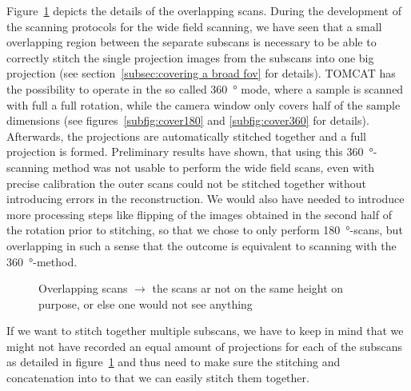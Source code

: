 Figure~\ref{fig:overlapping scans} depicts the details of the overlapping scans. During the development of the scanning protocols for the wide field scanning, we have seen that a small overlapping region between the separate subscans is necessary to be able to correctly stitch the single projection images from the subscans into one big projection (see section~\ref{subsec:covering a broad fov} for details). TOMCAT has the possibility to operate in the so called \SI{360}{\degree} mode, where a sample is scanned with full a full rotation, while the camera window only covers half of the sample dimensions (see figures~\ref{subfig:cover180} and \ref{subfig:cover360} for details). Afterwards, the projections are automatically stitched together and a full projection is formed. Preliminary results have shown, that using this \SI{360}{\degree}-scanning method was not usable to perform the wide field scans, even with precise calibration the outer scans could not be stitched together without introducing errors in the reconstruction. We would also have needed to introduce more processing steps like flipping of the images obtained in the second half of the rotation prior to stitching, so that we chose to only perform \SI{180}{\degree}-scans, but overlapping in such a sense that the outcome is equivalent to scanning with the \SI{360}{\degree}-method.

\begin{figure}
	\centering
	
	\caption{Overlapping scans $\rightarrow$ the scans ar not on the same height on purpose, or else one would not see anything}
	\label{fig:overlapping scans}
\end{figure}	

If we want to stitch together multiple subscans,  we have to keep in mind that we might not have recorded an equal amount of projections for each of the subscans as detailed in figure~\ref{fig:overlapping scans} and thus need to make sure the stitching and concatenation into to that we can easily stitch them together.

